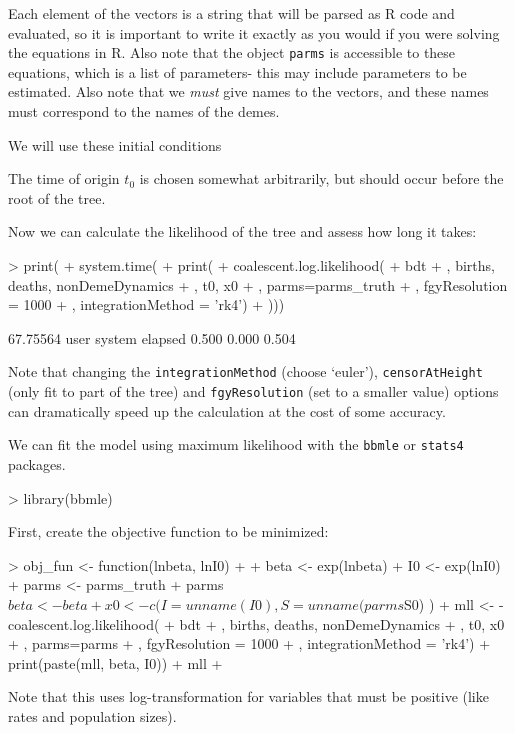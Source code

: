 \documentclass{article}
\begin{document}
Each element of the vectors is a string that will be parsed as R code and evaluated, so it is important to write it exactly as you would if you were solving the equations in R.
Also note that the object \texttt{parms} is accessible to these equations, which is a list of parameters- this may include parameters to be estimated.
Also note that we \emph{must} give names to the vectors, and these names must correspond to the names of the demes. 

We will use these initial conditions
\begin{Schunk}
\end{Schunk}
The time of origin $t_0$ is chosen somewhat arbitrarily, but should occur before the root of the tree. 

Now we can calculate the likelihood of the tree and assess how long it takes:
\begin{Schunk}
\begin{Sinput}
> print( 
+ system.time( 
+ print(
+   coalescent.log.likelihood(
+     bdt
+     , births, deaths, nonDemeDynamics
+     , t0, x0
+     , parms=parms_truth
+     , fgyResolution = 1000
+     , integrationMethod = 'rk4')
+ )))
\end{Sinput}
\begin{Soutput}
[1] 67.75564
   user  system elapsed 
  0.500   0.000   0.504 
\end{Soutput}
\end{Schunk}
Note that changing the \texttt{integrationMethod} (choose `euler'), \texttt{censorAtHeight} (only fit to part of the tree) and \texttt{fgyResolution} (set to a smaller value) options can dramatically speed up the calculation at the cost of some accuracy. 

We can fit the model using maximum likelihood with the \texttt{bbmle} or \texttt{stats4} packages. 
\begin{Schunk}
\begin{Sinput}
> 	library(bbmle)
\end{Sinput}
\end{Schunk}
First, create the objective function to be minimized:
\begin{Schunk}
\begin{Sinput}
> obj_fun <- function(lnbeta, lnI0)
+ {
+ 	beta <- exp(lnbeta)
+ 	I0 <- exp(lnI0)
+ 	parms <- parms_truth
+ 	parms$beta <- beta
+ 	x0 <- c(I=unname(I0), S = unname(parms$S0) )
+ 	mll <- -coalescent.log.likelihood(
+ 		bdt
+ 		, births, deaths, nonDemeDynamics
+ 		,  t0, x0
+ 		, parms=parms
+ 		, fgyResolution = 1000
+ 		, integrationMethod = 'rk4')
+ 	print(paste(mll, beta, I0))
+ 	mll
+ }
\end{Sinput}
\end{Schunk}
Note that this uses log-transformation for variables that must be positive (like rates and population sizes).
\end{document}
